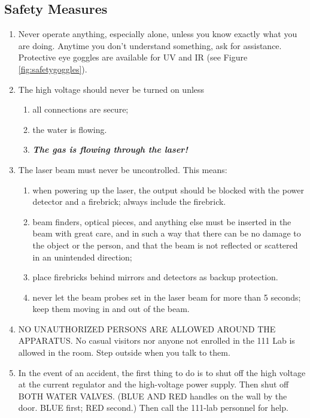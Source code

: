 \documentclass{../lab}
\begin{document}
\subsection{Safety Measures}

\begin{enumerate}
    \item Never operate anything, especially alone, unless you know exactly what you are doing. Anytime you don't understand something, ask for assistance. Protective eye goggles are available for UV and IR (see Figure \ref{fig:safetygoggles}).

    \item The high voltage should never be turned on unless
    \begin{enumerate}
        \item all connections are secure;

        \item the water is flowing.

        \item \emph{\textbf{The gas is flowing through the laser!}}

    \end{enumerate}

    \item The laser beam must never be uncontrolled. This means:
    \begin{enumerate}
        \item when powering up the laser, the output should be blocked with the power detector and a firebrick; always include the firebrick.

        \item beam finders, optical pieces, and anything else must be inserted in the beam with great care, and in such a way that there can be no damage to the object or the person, and that the beam is not reflected or scattered in an unintended direction;

        \item place firebricks behind mirrors and detectors as backup protection.

        \item never let the beam probes set in the laser beam for more than 5 seconds; keep them moving in and out of the beam.

    \end{enumerate}

    \item NO UNAUTHORIZED PERSONS ARE ALLOWED AROUND THE APPARATUS. No casual visitors nor anyone not enrolled in the 111 Lab is allowed in the room. Step outside when you talk to them.

    \item In the event of an accident, the first thing to do is to shut off the high voltage at the current regulator and the high-voltage power supply. Then shut off BOTH WATER VALVES. (BLUE AND RED handles on the wall by the door. BLUE first; RED second.) Then call the 111-lab personnel for help.

\end{enumerate}
\end{document}
